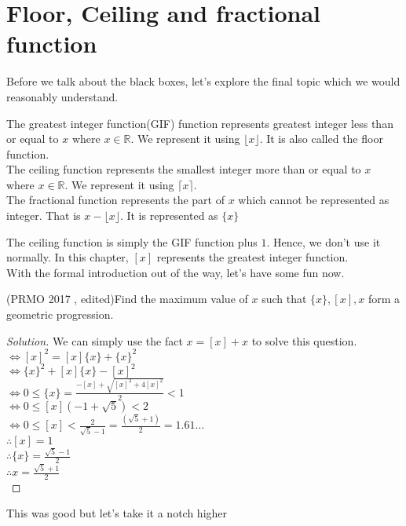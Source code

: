 \section{Floor, Ceiling and fractional function}
Before we talk about the black boxes, let's explore the final topic which we would reasonably understand.\\
\begin{definition}
    The greatest integer function(GIF) function represents greatest integer less than or equal to $x$ where $x \in \mathbb{R}$. We represent it using $\lfloor x \rfloor$. It is also called the floor function.\\
    The ceiling function represents the smallest integer more than or equal to $x$ where $x \in \mathbb{R}$. We represent it using $\lceil x \rceil$.\\
    The fractional function represents the part of $x$ which cannot be represented as integer. That is $x-\lfloor x \rfloor$. It is represented as $\{x\}$\\
\end{definition}
The ceiling function is simply the GIF function plus $1$. Hence, we don't use it normally. In this chapter, $[x]$ represents the greatest integer function.\\
With the formal introduction out of the way, let's have some fun now.\\
\begin{example}
    (PRMO 2017 , edited)Find the maximum value of $x$ such that $\{x\}, [x] , x$ form a geometric progression.
\end{example}
\begin{proof}
    [Solution]
    We can simply use the fact $x=[x]+{x}$ to solve this question.\\
    $\iff [x]^2=[x]\{x\}+\{x\}^2$\\
    $\iff \{x\}^2+[x]\{x\}-[x]^2$\\
    $\iff 0\leq \{x\} = \frac{-[x]+\sqrt{[x]^2+4[x]^2}}{2} <1$\\
    $\iff 0\leq [x](-1+\sqrt{5}) < 2$\\
    $\iff 0 \leq [x] < \frac{2}{\sqrt{5}-1} =\frac{(\sqrt{5}+1)}{2}=1.61 \dots$\\
    $\therefore [x]=1$\\
    $\therefore \{x\}=\frac{\sqrt{5}-1}{2}$\\
    $\therefore x= \frac{\sqrt{5}+1}{2}$\\
\end{proof}
This was good but let's take it a notch higher\\
